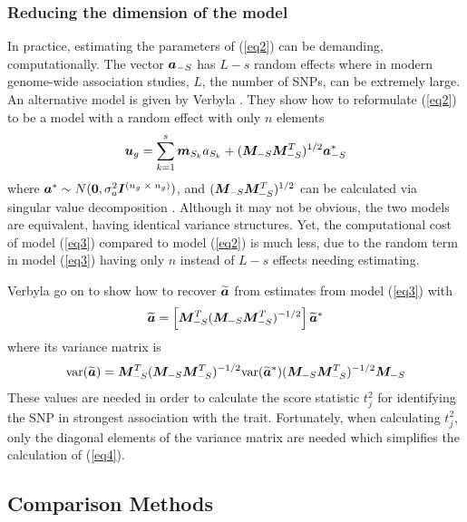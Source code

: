 \documentclass{nature}
\begin{document}
\subsubsection*{Reducing the dimension of the model}
In practice, estimating the parameters of (\ref{eq2}) can be demanding, computationally. 
The vector $\bm{a}_{-S}$ has $L-s$ random effects where in modern genome-wide association studies, 
$L$, the number of SNPs, can be extremely large.  An alternative model is given by 
Verbyla \cite{verbyla2012rwgaim,verbyla2014whole}. 
They show how to reformulate (\ref{eq2}) to be a model with a random effect with only $n$ elements
\begin{equation}
\label{eq3}
\bm{u}_g = \sum_{k=1}^s  \bm{m}_{S_k} a_{S_k} + (\bm{M}_{-S} \bm{M}_{-S}^T)^{1/2} \bm{a}^*_{-S}
\end{equation}
where $\bm{a}^* \sim N(\bm{0}, \sigma_a^2 \bm{I}^{(n_g \; \times \;  n_g)})$, and 
$(\bm{M}_{-S} \bm{M}_{-S}^T)^{1/2}$ can be calculated via singular value decomposition \cite{golub2012matrix}.  
Although it may not be obvious, the two models are equivalent, 
having identical variance structures. Yet, the computational cost of model (\ref{eq3}) compared to 
model (\ref{eq2}) is much less, due to the random term in model (\ref{eq3}) having only $n$ instead of $L-s$ 
effects needing estimating. 

Verbyla \cite{verbyla2012rwgaim,verbyla2014whole} go on to show how to recover $\widetilde{\bm{a}}$ from estimates from model  (\ref{eq3})  with 
\begin{equation}
\widetilde{\bm{a}} = \left [ \bm{M}_{-S}^T (\bm{M}_{-S} \bm{M}_{-S}^T)^{-1/2} \right ] \widetilde{\bm{a}}^*
\end{equation}
where its variance matrix is
\begin{equation}
\label{eq4}
\textrm{var}(\widetilde{\bm{a}}) = \bm{M}_{-S}^T (\bm{M}_{-S} \bm{M}_{-S}^T)^{-1/2} \textrm{var}(\widetilde{\bm{a}}^*) (\bm{M}_{-S} \bm{M}_{-S}^T)^{-1/2} \bm{M}_{-S}
\end{equation}
These values are needed in order to calculate the score statistic $t_j^2$ for identifying the SNP in strongest association with the trait. 
Fortunately, when calculating $t_j^2$, only the diagonal elements of the variance matrix are needed which simplifies the  calculation 
of (\ref{eq4}). 


\subsection{Comparison Methods}
\end{document}
